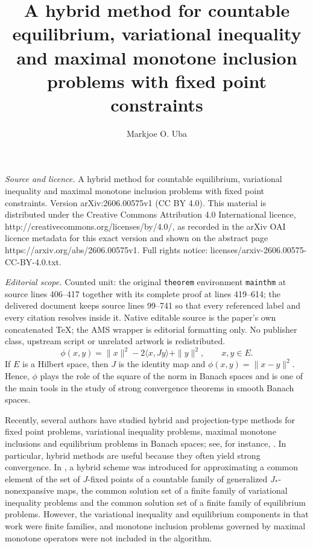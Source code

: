 \documentclass[10pt,a4paper]{amsart}
\numberwithin{equation}{section}
\begin{document}
\title[A hybrid method for countable equilibrium, variational inequ]{A hybrid method for countable equilibrium, variational inequality and maximal monotone inclusion problems with fixed point constraints}
\author{Markjoe O. Uba}
\date{}
\maketitle
\noindent\emph{Source and licence.} A hybrid method for countable equilibrium, variational inequality and maximal monotone inclusion problems with fixed point constraints. Version arXiv:2606.00575v1 (CC BY 4.0). This material is distributed under the Creative Commons Attribution 4.0 International licence, http://creativecommons.org/licenses/by/4.0/, as recorded in the arXiv OAI licence metadata for this exact version and shown on the abstract page https://arxiv.org/abs/2606.00575v1. Full rights notice: licenses/arxiv-2606.00575-CC-BY-4.0.txt.\par\smallskip
\noindent\textit{Editorial scope.} Counted unit: the original \texttt{theorem} environment \texttt{mainthm} at source lines 406--417 together with its complete proof at lines 419--614; the delivered document keeps source lines 99--741 so that every referenced label and every citation resolves inside it. Native editable source is the paper's own concatenated TeX; the AMS wrapper is editorial formatting only. No publisher class, upstream script or unrelated artwork is redistributed.
\begin{equation}\label{phi}
\phi(x,y)=\|x\|^{2}-2\langle x,Jy\rangle+\|y\|^{2},\qquad x,y\in E.
\end{equation}
If $E$ is a Hilbert space, then $J$ is the identity map and $\phi(x,y)=\|x-y\|^{2}$. Hence, $\phi$ plays the role of the square of the norm in Banach spaces and is one of the main tools in the study of strong convergence theorems in smooth Banach spaces.

Recently, several authors have studied hybrid and projection-type methods for fixed point problems, variational inequality problems, maximal monotone inclusions and equilibrium problems in Banach spaces; see, for instance, \cite{ChidumeIdu2016,ChidumeOtuboEzeaUba2017,KlineamSuantaiTakahashi2012}. In particular, hybrid methods are useful because they often yield strong convergence. In \cite{UbaCarpathian2023}, a hybrid scheme was introduced for approximating a common element of the set of $J$-fixed points of a countable family of generalized $J_{*}$-nonexpansive maps, the common solution set of a finite family of variational inequality problems and the common solution set of a finite family of equilibrium problems. However, the variational inequality and equilibrium components in that work were finite families, and monotone inclusion problems governed by maximal monotone operators were not included in the algorithm.
\end{document}

